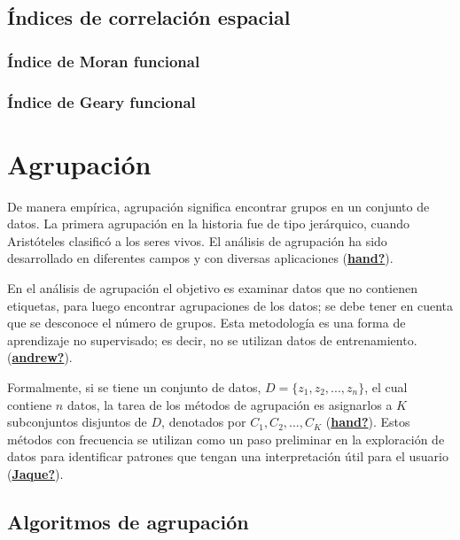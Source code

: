 \documentclass[
]{book}
\begin{document}
\hypertarget{uxedndices-de-correlaciuxf3n-espacial}{%
\section{Índices de correlación espacial}\label{uxedndices-de-correlaciuxf3n-espacial}}

\hypertarget{uxedndice-de-moran-funcional}{%
\subsection{Índice de Moran funcional}\label{uxedndice-de-moran-funcional}}

\hypertarget{uxedndice-de-geary-funcional}{%
\subsection{Índice de Geary funcional}\label{uxedndice-de-geary-funcional}}

\hypertarget{agrupaciuxf3n}{%
\chapter{Agrupación}\label{agrupaciuxf3n}}

De manera empírica, agrupación significa encontrar grupos en un conjunto de datos. La primera agrupación en la historia fue de tipo jerárquico, cuando Aristóteles clasificó a los seres vivos. El análisis de agrupación ha sido desarrollado en diferentes campos y con diversas aplicaciones (\protect\hyperlink{ref-hand}{\textbf{hand?}}).

En el análisis de agrupación el objetivo es examinar datos que no contienen etiquetas, para luego encontrar agrupaciones de los datos; se debe tener en cuenta que se desconoce el número de grupos. Esta metodología es una forma de aprendizaje no supervisado; es decir, no se utilizan datos de entrenamiento. (\protect\hyperlink{ref-andrew}{\textbf{andrew?}}).

Formalmente, si se tiene un conjunto de datos, \(D=\{z_1,z_2,...,z_n\}\), el cual contiene \(n\) datos, la tarea de los métodos de agrupación es asignarlos a \(K\) subconjuntos disjuntos de \(D\), denotados por \(C_1,C_2,...,C_K\) (\protect\hyperlink{ref-hand}{\textbf{hand?}}). Estos métodos con frecuencia se utilizan como un paso preliminar en la exploración de datos para identificar patrones que tengan una interpretación útil para el usuario (\protect\hyperlink{ref-Jaque}{\textbf{Jaque?}}).

\hypertarget{algoritmos-de-agrupaciuxf3n}{%
\section{Algoritmos de agrupación}\label{algoritmos-de-agrupaciuxf3n}}
\end{document}
